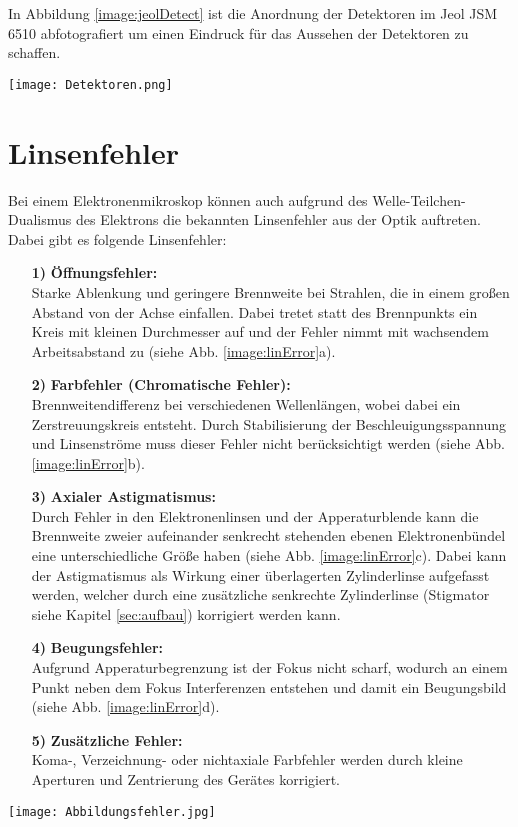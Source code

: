 In Abbildung \ref{image:jeolDetect} ist die Anordnung der Detektoren im Jeol JSM 6510 abfotografiert um einen Eindruck für das Aussehen der Detektoren zu schaffen.
\begin{center}
    \texttt{[image: Detektoren.png]}
    \label{image:jeolDetect}
\end{center}
\newpage
\section{Linsenfehler}
\label{sec:linError}

Bei einem Elektronenmikroskop können auch aufgrund des Welle-Teilchen-Dualismus des Elektrons die bekannten Linsenfehler aus der Optik auftreten. Dabei gibt es folgende Linsenfehler:
\begin{itemize}
    \item[\textbf{1)}]\textbf{Öffnungsfehler:}\\
    Starke Ablenkung und geringere Brennweite bei Strahlen, die in einem großen Abstand von der Achse einfallen. Dabei tretet statt des Brennpunkts ein Kreis mit kleinen Durchmesser auf und der Fehler nimmt mit wachsendem Arbeitsabstand zu (siehe Abb. \ref{image:linError}a). 
    \item[\textbf{2)}]\textbf{Farbfehler (Chromatische Fehler):}\\
    Brennweitendifferenz bei verschiedenen Wellenlängen, wobei dabei ein Zerstreuungskreis entsteht. Durch Stabilisierung der Beschleuigungsspannung und Linsenströme muss dieser Fehler nicht berücksichtigt werden (siehe Abb. \ref{image:linError}b).
    \item[\textbf{3)}]\textbf{Axialer Astigmatismus:}\\
    Durch Fehler in den Elektronenlinsen und der Apperaturblende kann die Brennweite zweier aufeinander senkrecht stehenden ebenen Elektronenbündel eine unterschiedliche Größe haben (siehe Abb. \ref{image:linError}c). Dabei kann der Astigmatismus als Wirkung einer überlagerten Zylinderlinse aufgefasst werden, welcher durch eine zusätzliche senkrechte Zylinderlinse (Stigmator siehe Kapitel \ref{sec:aufbau}) korrigiert werden kann. 
    \item[\textbf{4)}]\textbf{Beugungsfehler:}\\
    Aufgrund Apperaturbegrenzung ist der Fokus nicht scharf, wodurch an einem Punkt neben dem Fokus Interferenzen entstehen und damit ein Beugungsbild (siehe Abb. \ref{image:linError}d).
    \item[\textbf{5)}]\textbf{Zusätzliche Fehler:}\\
    Koma-, Verzeichnung- oder nichtaxiale Farbfehler werden durch kleine Aperturen und Zentrierung des Gerätes korrigiert. 
\end{itemize}
\newpage
\begin{center}
    \texttt{[image: Abbildungsfehler.jpg]}
    \label{image:linError}
\end{center}

